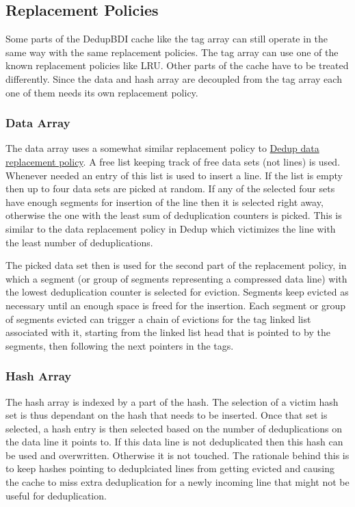 \subsection{Replacement Policies}
\label{ssec:Replacement Policies}
Some parts of the DedupBDI cache like the tag array can still operate in the same way with the same replacement policies. The tag array can use one of the known replacement policies like LRU. Other parts of the cache have to be treated differently. Since the data and hash array are decoupled from the tag array each one of them needs its own replacement policy.
\subsubsection{Data Array}
\label{sssec:DedupBDIDataRepl}
The data array uses a somewhat similar replacement policy to \hyperref[sssec:DedupDataRepl]{Dedup data replacement policy}. A free list keeping track of free data sets (not lines) is used. Whenever needed an entry of this list is used to insert a line. If the list is empty then up to four data sets are picked at random. If any of the selected four sets have enough segments for insertion of the line then it is selected right away, otherwise the one with the least sum of deduplication counters is picked. This is similar to the data replacement policy in Dedup which victimizes the line with the least number of deduplications.\par
The picked data set then is used for the second part of the replacement policy, in which a segment (or group of segments representing a compressed data line) with the lowest deduplication counter is selected for eviction. Segments keep evicted as necessary until an enough space is freed for the insertion. Each segment or group of segments evicted can trigger a chain of evictions for the tag linked list associated with it, starting from the linked list head that is pointed to by the segments, then following the next pointers in the tags.
\subsubsection{Hash Array}
\label{sssec:DedupBDIHashRepl}
The hash array is indexed by a part of the hash. The selection of a victim hash set is thus dependant on the hash that needs to be inserted. Once that set is selected, a hash entry is then selected based on the number of deduplications on the data line it points to. If this data line is not deduplicated then this hash can be used and overwritten. Otherwise it is not touched. The rationale behind this is to keep hashes pointing to deduplciated lines from getting evicted and causing the cache to miss extra deduplication for a newly incoming line that might not be useful for deduplication.

